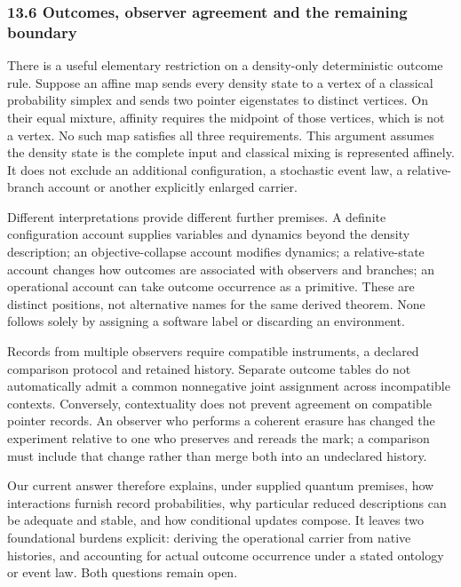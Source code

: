\documentclass[
  11pt,
]{article}
\begin{document}
\subsubsection{13.6 Outcomes, observer agreement and the remaining
boundary}\label{outcomes-observer-agreement-and-the-remaining-boundary}

There is a useful elementary restriction on a density-only deterministic
outcome rule. Suppose an affine map sends every density state to a
vertex of a classical probability simplex and sends two pointer
eigenstates to distinct vertices. On their equal mixture, affinity
requires the midpoint of those vertices, which is not a vertex. No such
map satisfies all three requirements. This argument assumes the density
state is the complete input and classical mixing is represented
affinely. It does not exclude an additional configuration, a stochastic
event law, a relative-branch account or another explicitly enlarged
carrier.

Different interpretations provide different further premises. A definite
configuration account supplies variables and dynamics beyond the density
description; an objective-collapse account modifies dynamics; a
relative-state account changes how outcomes are associated with
observers and branches; an operational account can take outcome
occurrence as a primitive. These are distinct positions, not alternative
names for the same derived theorem. None follows solely by assigning a
software label or discarding an environment.

Records from multiple observers require compatible instruments, a
declared comparison protocol and retained history. Separate outcome
tables do not automatically admit a common nonnegative joint assignment
across incompatible contexts. Conversely, contextuality does not prevent
agreement on compatible pointer records. An observer who performs a
coherent erasure has changed the experiment relative to one who
preserves and rereads the mark; a comparison must include that change
rather than merge both into an undeclared history.

Our current answer therefore explains, under supplied quantum premises,
how interactions furnish record probabilities, why particular reduced
descriptions can be adequate and stable, and how conditional updates
compose. It leaves two foundational burdens explicit: deriving the
operational carrier from native histories, and accounting for actual
outcome occurrence under a stated ontology or event law. Both questions
remain open.
\end{document}
